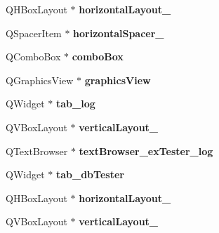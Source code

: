 \begin{DoxyCompactItemize}
\mbox{\label{class_ui___main_window_ac9e409a7658b17fd6520100b24177546}} 
Q\+H\+Box\+Layout $\ast$ {\bfseries horizontal\+Layout\+\_}
\item 
\mbox{\label{class_ui___main_window_a71605bcf74c938f64207451850fc69b1}} 
Q\+Spacer\+Item $\ast$ {\bfseries horizontal\+Spacer\+\_}
\item 
\mbox{\label{class_ui___main_window_af4df84479fcdbcc4c6d2d3e39046317a}} 
Q\+Combo\+Box $\ast$ {\bfseries combo\+Box}
\item 
\mbox{\label{class_ui___main_window_a713d8e541d9de8389ad4292131dc931a}} 
Q\+Graphics\+View $\ast$ {\bfseries graphics\+View}
\item 
\mbox{\label{class_ui___main_window_a50533ee68326d832bc02503dc4b0e4bb}} 
Q\+Widget $\ast$ {\bfseries tab\+\_\+log}
\item 
\mbox{\label{class_ui___main_window_a97deca0d70ed4bd4d4d7a3627e27d6b4}} 
Q\+V\+Box\+Layout $\ast$ {\bfseries vertical\+Layout\+\_}
\item 
\mbox{\label{class_ui___main_window_a1967b937ab2c843c71c68263357d6f90}} 
Q\+Text\+Browser $\ast$ {\bfseries text\+Browser\+\_\+ex\+Tester\+\_\+log}
\item 
\mbox{\label{class_ui___main_window_a8a97b7d1c3b05f3e4e5a460d8a071245}} 
Q\+Widget $\ast$ {\bfseries tab\+\_\+db\+Tester}
\item 
\mbox{\label{class_ui___main_window_ae430c7c1e898df86426492f9ae920924}} 
Q\+H\+Box\+Layout $\ast$ {\bfseries horizontal\+Layout\+\_}
\item 
\mbox{\label{class_ui___main_window_a25a8640c9bbe458aef0ff01cb8ee953f}} 
Q\+V\+Box\+Layout $\ast$ {\bfseries vertical\+Layout\+\_}
\item 
\mbox{\label{class_ui___main_window_a345787f9c381c0053113d31b2a75e753}} 

\end{DoxyCompactItemize}
